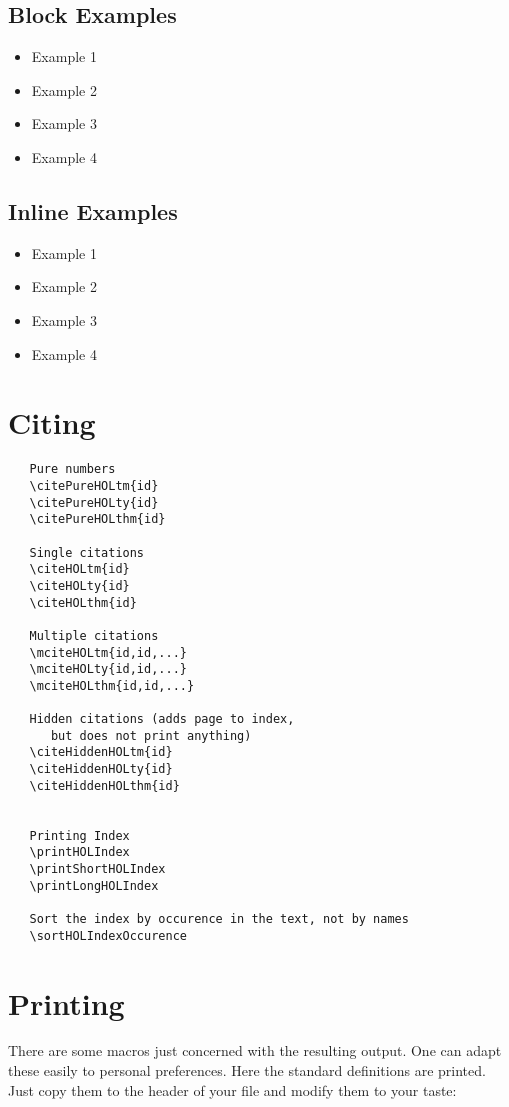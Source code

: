 \documentclass{scrartcl}
\begin{document}
\subsection{Block Examples}
\begin{itemize}
\item Example 1 
\item Example 2 
\item Example 3 
\item Example 4 
\end{itemize}


\subsection{Inline Examples}
\begin{itemize}
\item Example 1 
\item Example 2 
\item Example 3 
\item Example 4 
\end{itemize}



\section{Citing}

\begin{verbatim}
   Pure numbers
   \citePureHOLtm{id}
   \citePureHOLty{id}
   \citePureHOLthm{id}

   Single citations
   \citeHOLtm{id}
   \citeHOLty{id}
   \citeHOLthm{id}

   Multiple citations 
   \mciteHOLtm{id,id,...}
   \mciteHOLty{id,id,...}
   \mciteHOLthm{id,id,...}

   Hidden citations (adds page to index, 
      but does not print anything)
   \citeHiddenHOLtm{id}
   \citeHiddenHOLty{id}
   \citeHiddenHOLthm{id}


   Printing Index 
   \printHOLIndex
   \printShortHOLIndex 
   \printLongHOLIndex 

   Sort the index by occurence in the text, not by names
   \sortHOLIndexOccurence
\end{verbatim}


\section{Printing}
There are some macros just concerned with the resulting output.
One can adapt these easily to personal preferences. Here the standard
definitions are printed. Just copy them to the header of your file
and modify them to your taste:
\end{document}

